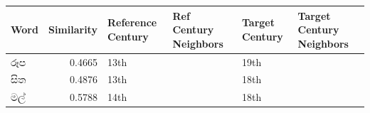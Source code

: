 ﻿\begin{tabular}{lrllll}
\toprule
Word & Similarity & Reference Century & Ref Century Neighbors & Target Century & Target Century Neighbors \\
\midrule
රූප & 0.4665 & 13th & & 19th & \\
සිත & 0.4876 & 13th & & 18th & \\
මල් & 0.5788 & 14th & & 18th & \\
\bottomrule
\end{tabular}
